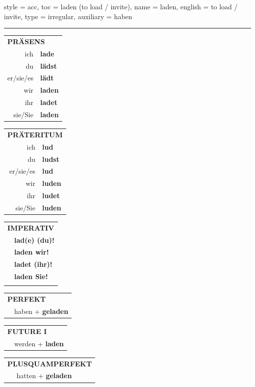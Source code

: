 \begin{verbentry}{
  style = {acc},
  toc = {laden (to load / invite)},
  name = {laden},
  english = {to load / invite},
  type = {irregular},
  auxiliary = {haben}
}
 
    
     \vspace{5pt}

    \hrule
    
    \vspace{5pt}

  \begin{tabular}{rl}
     \multicolumn{2}{l}{\textbf{PRÄSENS} }\\
    ich & \textbf{lade}\\
    du & \textbf{lädst}\\
    er/sie/es & \textbf{lädt}\\
    wir & \textbf{laden}\\
    ihr & \textbf{ladet}\\
    sie/Sie & \textbf{laden}\\
  \end{tabular}
  \hfill
  \begin{tabular}{rl}
    \multicolumn{2}{l}{\textbf{PRÄTERITUM} }\\
    ich & \textbf{lud}\\
    du & \textbf{ludst}\\
    er/sie/es & \textbf{lud}\\
    wir & \textbf{luden}\\
    ihr & \textbf{ludet}\\
    sie/Sie & \textbf{luden}\\
  \end{tabular}
  \hfill
  \begin{tabular}{rl}
     \multicolumn{2}{l}{\textbf{IMPERATIV} }\\
   & \textbf{lad(e) (du)!}\\
   & \textbf{laden wir!}\\
   & \textbf{ladet (ihr)!}\\
   & \textbf{laden Sie!}\\
   & \vspace{10pt}
  \end{tabular}

 \vspace{10pt}

 \begin{tabular}{rl}
     \multicolumn{2}{l}{\textbf{PERFEKT}}\\
   & haben + \textbf{geladen}\\
  \end{tabular}
\hfill
\begin{tabular}{rl}
    \multicolumn{2}{l}{\textbf{FUTURE I}}\\
   & werden + \textbf{laden}\\
  \end{tabular}
\hfill
\begin{tabular}{rl}
    \multicolumn{2}{l}{\textbf{PLUSQUAMPERFEKT}}\\
   & hatten + \textbf{geladen}\\
  \end{tabular}


\end{verbentry}
